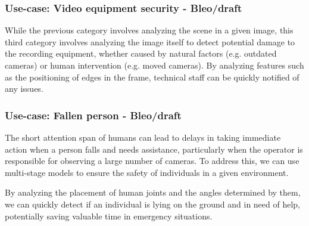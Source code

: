 \documentclass{article}
\begin{document}
    \subsubsection{Use-case: Video equipment security - Bleo/draft}
    While the previous category involves analyzing the scene in a given image, this third category involves analyzing the image itself to detect potential damage to the recording equipment, whether caused by natural factors (e.g. outdated cameras) or human intervention (e.g. moved cameras). By analyzing features such as the positioning of edges in the frame, technical staff can be quickly notified of any issues.

    \subsubsection{Use-case: Fallen person - Bleo/draft}

    The short attention span of humans can lead to delays in taking immediate action when a person falls and needs assistance, particularly when the operator is responsible for observing a large number of cameras. To address this, we can use multi-stage models to ensure the safety of individuals in a given environment.
    
    By analyzing the placement of human joints and the angles determined by them, we can quickly detect if an individual is lying on the ground and in need of help, potentially saving valuable time in emergency situations.
\end{document}
